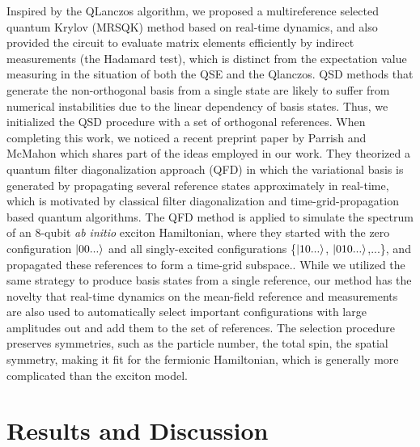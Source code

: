 \documentclass[journal=jctcce,manuscript=article]{achemso}
\begin{document}
Inspired by the QLanczos algorithm, we proposed a multireference selected quantum Krylov (MRSQK) method\cite{stair2019multireference} based on real-time dynamics, and also provided the circuit to evaluate matrix elements efficiently by indirect measurements (the Hadamard test),\cite{aharonov2009polynomial} which is distinct from the expectation value measuring in the situation of both the QSE\cite{McClean:2017ct} and the Qlanczos.\cite{Motta:2019bu}
QSD methods that generate the non-orthogonal basis from a single state are likely to suffer from numerical instabilities due to the linear dependency of basis states.\cite{Motta:2019bu,Huggins:2019vv} Thus, we initialized the QSD procedure with a set of orthogonal references.
When completing this work, we noticed a recent preprint paper by Parrish and McMahon\cite{Parrish:2019tc} which shares part of the ideas employed in our work. 
They theorized a quantum filter diagonalization approach (QFD) in which the variational basis is generated by propagating several reference states approximately in real-time, which is motivated by classical filter diagonalization\cite{Neuhauser:1994jp,Neuhauser:1990dp,wall1995extraction, mandelshtam1997low} and time-grid-propagation based quantum algorithms.\cite{Somma:2002jo,Somma:2019th,OBrien:2019cw,Kyriienko:2020gg} 
The QFD method is applied to simulate the spectrum of an 8-qubit \textit{ab initio} exciton Hamiltonian, where they started with the zero configuration $\left\vert{00...}\right\rangle$ and all singly-excited configurations \{$\left\vert{10...}\right\rangle$, $\left\vert{010...}\right\rangle$,...\}, and propagated these references to form a time-grid subspace.\cite{Parrish:2019tc}.
While we utilized the same strategy to produce basis states from a single reference, our method has the novelty that real-time dynamics on the mean-field reference and measurements are also used to automatically select important configurations with large amplitudes out and add them to the set of references. The selection procedure preserves symmetries, such as the particle number, the total spin, the spatial symmetry, making it fit for the fermionic Hamiltonian, which is generally more complicated than the exciton model.


\section{Results and Discussion}
\end{document}
